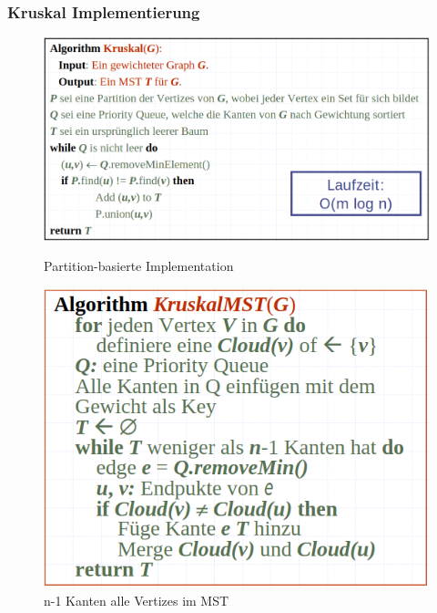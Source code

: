 \subsubsection{Kruskal Implementierung}
\begin{figure}[ht!]
	\begin{minipage}[t]{0.8\textwidth}
		\centering
		\includegraphics[width=0.9\linewidth]{images/kruskalpartitionbased}
		\caption{Partition-basierte Implementation}
		\label{fig:partitionbasedbased}
	\end{minipage}
	\begin{minipage}[t]{0.8\textwidth}
		\centering
		\includegraphics[width=0.9\linewidth]{images/kruskalalg}
		\caption{n-1 Kanten alle Vertizes im MST}
		\label{fig:kruskalpseudo}
	\end{minipage}
\end{figure}
\clearpage

